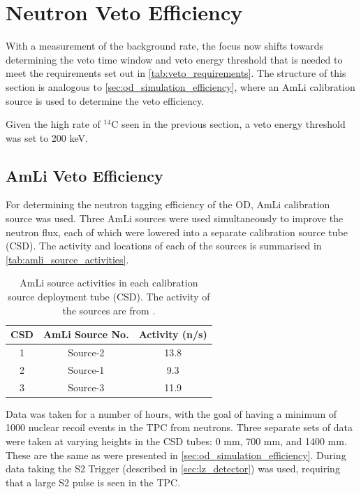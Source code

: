 \section{Neutron Veto Efficiency}
\par
With a measurement of the background rate, the focus now shifts towards determining the veto time window and veto energy threshold that is needed to meet the requirements set out in \autoref{tab:veto_requirements}.
The structure of this section is analogous to \autoref{sec:od_simulation_efficiency}, where an AmLi calibration source is used to determine the veto efficiency.
\par
Given the high rate of ${}^{14}$C seen in the previous section, a veto energy threshold was set to 200 keV.

\subsection{AmLi Veto Efficiency}
\par
For determining the neutron tagging efficiency of the OD, AmLi calibration source was used.
Three AmLi sources were used simultaneously to improve the neutron flux, each of which were lowered into a separate calibration source tube (CSD).
The activity and locations of each of the sources is summarised in \autoref{tab:amli_source_activities}.

\begin{table}[]
    \centering
    \begin{tabular}{c|c|c}
        CSD & AmLi Source No. & Activity (n/s) \\ \hline
        1   & Source-2        & 13.8           \\
        2   & Source-1        & 9.3            \\ 
        3   & Source-3        & 11.9                
    \end{tabular}
    \caption{AmLi source activities in each calibration source deployment tube (CSD).
             The activity of the sources are from \cite{LZ_TechnicalDesignReview_ref}.}
    \label{tab:amli_source_activities}
\end{table}

\par
Data was taken for a number of hours, with the goal of having a minimum of 1000 nuclear recoil events in the TPC from neutrons.
Three separate sets of data were taken at varying heights in the CSD tubes: 0 mm, 700 mm, and 1400 mm.
These are the same as were presented in \autoref{sec:od_simulation_efficiency}.
During data taking the S2 Trigger (described in \autoref{sec:lz_detector}) was used, requiring that a large S2 pulse is seen in the TPC.

